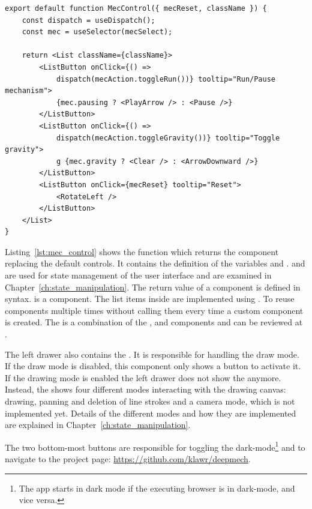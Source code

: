 \begin{lstlisting}[label={lst:mec_control}, caption={Definition of the \name{MecControl} component.}]
export default function MecControl({ mecReset, className }) {
    const dispatch = useDispatch();
    const mec = useSelector(mecSelect);

    return <List className={className}>
        <ListButton onClick={() =>
            dispatch(mecAction.toggleRun())} tooltip="Run/Pause mechanism">
            {mec.pausing ? <PlayArrow /> : <Pause />}
        </ListButton>
        <ListButton onClick={() =>
            dispatch(mecAction.toggleGravity())} tooltip="Toggle gravity">
            g {mec.gravity ? <Clear /> : <ArrowDownward />}
        </ListButton>
        <ListButton onClick={mecReset} tooltip="Reset">
            <RotateLeft />
        </ListButton>
    </List>
}
\end{lstlisting}

Listing~\ref{lst:mec_control} shows the function which returns the component replacing the default  controls.
It contains the definition of the variables  and .
 and  are used for state management of the user interface and are examined in Chapter~\ref{ch:state_manipulation}.
The return value of a component is defined in  syntax.
 is a  component.
The list items inside are implemented using .
To reuse  components multiple times without calling them every time a custom  component is created.
The  is a combination of the ,  and  components and can be reviewed at .

The left drawer also contains the .
It is responsible for handling the draw mode.
If the draw mode is disabled, this component only shows a button to activate it.
If the drawing mode is enabled the left drawer does not show the  anymore.
Instead, the  shows four different modes interacting with the drawing canvas: drawing, panning and deletion of line strokes and a camera mode, which is not implemented yet.
Details of the different modes and how they are implemented are explained in Chapter~\ref{ch:state_manipulation}.

The two bottom-most buttons are responsible for toggling the dark-mode\footnote{The app starts in dark mode if the executing browser is in dark-mode, and vice versa.} and to navigate to the project page: \url{https://github.com/klawr/deepmech}.

